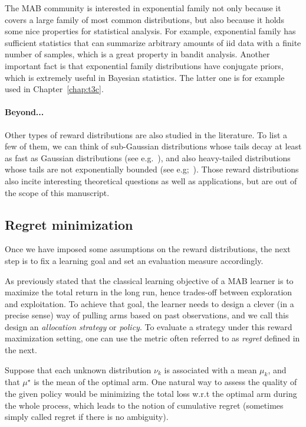 The MAB community is interested in exponential family not only because it covers a large family of most common distributions, but also because it holds some nice properties for statistical analysis. For example, exponential family has sufficient statistics that can summarize arbitrary amounts of \gls{iid} data with a finite number of samples, which is a great property in bandit analysis. Another important fact is that exponential family distributions have conjugate priors, which is extremely useful in Bayesian statistics. The latter one is for example used in Chapter~\ref{chap:t3c}.

\paragraph{Beyond...}

Other types of reward distributions are also studied in the literature. To list a few of them, we can think of sub-Gaussian distributions whose tails decay at least as fast as Gaussian distributions (see e.g.~\citealt{}), and also heavy-tailed distributions whose tails are not exponentially bounded (see e.g;~\citealt{yu2018heavy}). Those reward distributions also incite interesting theoretical questions as well as applications, but are out of the scope of this manuscript.

\subsection{Regret minimization}\label{sec:mab.model.regret}

Once we have imposed some assumptions on the reward distributions, the next step is to fix a learning goal and set an evaluation measure accordingly.

As previously stated that the classical learning objective of a MAB learner is to maximize the total return in the long run, hence trades-off between exploration and exploitation. To achieve that goal, the learner needs to design a clever (in a precise sense) way of pulling arms based on past observations, and we call this design an \emph{allocation strategy} or \emph{policy}. To evaluate a strategy under this reward maximization setting, one can use the metric often referred to as \emph{regret} defined in the next. 

Suppose that each unknown distribution $\nu_k$ is associated with a mean $\mu_k$, and that $\mu^{\star}$ is the mean of the optimal arm. One natural way to assess the quality of the given policy would be minimizing the total loss w.r.t the optimal arm during the whole process, which leads to the notion of \gls{cumulative regret} (sometimes simply called regret if there is no ambiguity).

